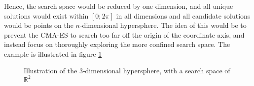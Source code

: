 Hence, the search space would be reduced by one dimension, and all unique solutions would exist
within $[0; 2 \pi]$ in all dimensions and all candidate solutions would be points on the $n$-dimensional
hypersphere. The idea of this would be to prevent the CMA-ES to search too far off the origin of the
coordinate axis, and instead focus on thoroughly exploring the more confined search space.
The example is illustrated in figure \ref{fig:searchInAngles}

\begin{figure}[H]
\begin{center}
\end{center}
\caption{Illustration of the 3-dimensional hypersphere, with a search space of $\mathbb{R}^2$
\label{fig:searchInAngles}}
\end{figure}



